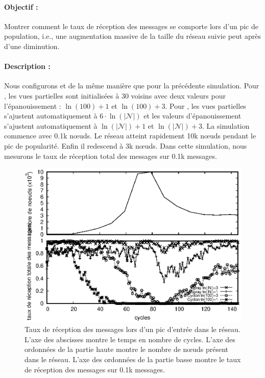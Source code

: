 
\paragraph{Objectif :} Montrer comment le taux de réception des messages se
comporte lors d'un pic de population, i.e., une augmentation massive de la
taille du réseau suivie peut après d'une diminution.

\paragraph{Description :} Nous configurons \SPRAY et \CYCLON de la même manière
que pour la précédente simulation. Pour \CYCLON, les vues partielles sont
initialisées à 30 voisins avec deux valeurs pour l'épanouissement : $\ln(100)+1$
et $\ln(100)+3$. Pour \SPRAY, les vues partielles s'ajustent automatiquement à
$6\cdot \ln(|\mathcal{N}|)$ et les valeurs d'épanouissement s'ajustent
automatiquement à $\ln(|\mathcal{N}|)+1$ et $\ln(|\mathcal{N}|)+3$. La
simulation commence avec 0.1k nœuds. Le réseau atteint rapidement 10k nœuds
pendant le pic de popularité. Enfin il redescend à 3k nœuds. Dans cette
simulation, nous mesurons le taux de réception total des messages sur 0.1k
messages.

\begin{figure}
  \begin{center}
    \includegraphics[width=.8\textwidth]{img/spray/peak.eps}
    \caption[Taux de réception des messages lors d'un pic de
    population]{\label{net:fig:peak} Taux de réception des messages lors d'un
      pic d'entrée dans le réseau. L'axe des abscisses montre le temps en
      nombre de cycles. L'axe des ordonnées de la partie haute montre le nombre
      de nœuds présent dans le réseau. L'axe des ordonnées de la partie basse
      montre le taux de réception des messages sur 0.1k messages.}
  \end{center}
\end{figure}

